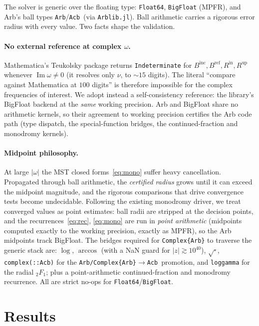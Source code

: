 \documentclass[12pt,a4paper]{article}
\newcommand{\Binc}{B^{\mathrm{inc}}}
\newcommand{\Bref}{B^{\mathrm{ref}}}
\newcommand{\Rin}{R^{\mathrm{in}}}
\newcommand{\Rup}{R^{\mathrm{up}}}
\newcommand{\Acb}{\texttt{Acb}}
\newcommand{\Arb}{\texttt{Arb}}
\begin{document}
The solver is generic over the floating type: \texttt{Float64},
\texttt{BigFloat} (MPFR), and Arb's ball types \Arb/\Acb\ (via
\texttt{Arblib.jl}).  Ball arithmetic carries a rigorous error radius with every
value.  Two facts shape the validation.

\paragraph{No external reference at complex $\omega$.}
Mathematica's \textsf{Teukolsky} package returns \texttt{Indeterminate} for
$\Binc,\Bref,\Rin,\Rup$ whenever $\operatorname{Im}\omega\neq0$ (it resolves only
$\nu$, to $\sim15$ digits).  The literal ``compare against Mathematica at $100$
digits'' is therefore impossible for the complex frequencies of interest.  We
adopt instead a self-consistency reference: the library's BigFloat backend at the
\emph{same} working precision.  Arb and BigFloat share no arithmetic kernels, so
their agreement to working precision certifies the Arb code path (type dispatch,
the special-function bridges, the continued-fraction and monodromy kernels).

\paragraph{Midpoint philosophy.}
At large $|\omega|$ the MST closed forms~\eqref{eq:mono} suffer heavy
cancellation.  Propagated through ball arithmetic, the \emph{certified radius}
grows until it can exceed the midpoint magnitude, and the rigorous comparisons
that drive convergence tests become undecidable.  Following the existing
monodromy driver, we treat converged values as point estimates: ball radii are
stripped at the decision points, and the recurrences~\eqref{eq:rec},
\eqref{eq:mono} are run in \emph{point arithmetic} (midpoints computed exactly to
the working precision, exactly as MPFR), so the Arb midpoints track BigFloat.
The bridges required for \texttt{Complex\{Arb\}} to traverse the generic stack are:
$\log$, $\arccos$ (with a NaN guard for $|z|\gtrsim10^{40}$), $\sqrt{\cdot}$,
\texttt{complex(::Acb)} for the \texttt{Arb/Complex\{Arb\}}$\to$\Acb\ promotion,
and \texttt{loggamma} for the radial ${}_2F_1$; plus a point-arithmetic
continued-fraction and monodromy recurrence.  All are strict no-ops for
\texttt{Float64}/\texttt{BigFloat}.

\section{Results}
\end{document}
